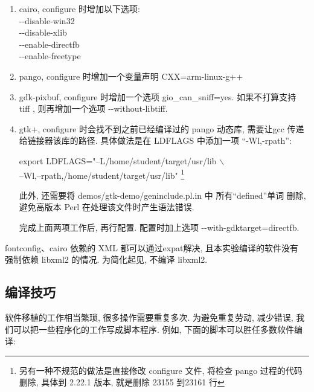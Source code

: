 \begin{enumerate}
  \item cairo,  configure 时增加以下选项:\\
      -{}-disable-win32 \\
      -{}-disable-xlib \\
      -{}-enable-directfb \\
      -{}-enable-freetype

  \item pango, configure 时增加一个变量声明 CXX=arm-linux-g++

  \item gdk-pixbuf, configure 时增加一个选项 gio\_can\_sniff=yes.
      如果不打算支持 tiff , 则再增加一个选项 -{}-without-libtiff.

  \item gtk+, configure 时会找不到之前已经编译过的 pango 动态库, 需要让gcc
      传递给链接器该库的路径. 具体做法是在 LDFLAGS 中添加一项 ``-Wl,-rpath'':

      export LDFLAGS="--L/home/student/target/usr/lib $\backslash$ \\ 
         --Wl,--rpath,/home/student/target/usr/lib"
      \footnote{另有一种不规范的做法是直接修改 configure 文件, 将检查 pango
      过程的代码删除, 具体到 2.22.1 版本, 就是删除 23155 到23161 行}

     此外, 还需要将 demos/gtk-demo/geninclude.pl.in 中 所有``defined''单词
     删除,避免高版本 Perl 在处理该文件时产生语法错误.

     完成上面两项工作后, 再行配置. 配置时加上选项
     -{}-with-gdktarget=directfb.
\end{enumerate}

fontconfig、cairo 依赖的 XML 都可以通过expat解决, 且本实验编译的软件没有
强制依赖 libxml2 的情况. 为简化起见, 不编译 libxml2.

\subsection{编译技巧}
    软件移植的工作相当繁琐, 很多操作需要重复多次. 为避免重复劳动, 减少错误,
我们可以把一些程序化的工作写成脚本程序. 例如, 下面的脚本可以胜任多数软件编译:

